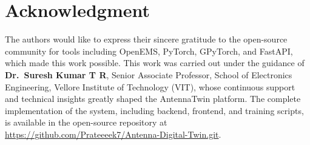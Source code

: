 \documentclass[conference]{IEEEtran}
\begin{document}
\section*{Acknowledgment}
The authors would like to express their sincere gratitude to the open-source community for tools including OpenEMS, PyTorch, GPyTorch, and FastAPI, which made this work possible. This work was carried out under the guidance of \textbf{Dr.\ Suresh Kumar T R}, Senior Associate Professor, School of Electronics Engineering, Vellore Institute of Technology (VIT), whose continuous support and technical insights greatly shaped the AntennaTwin platform. The complete implementation of the system, including backend, frontend, and training scripts, is available in the open-source repository at \url{https://github.com/Prateeeek7/Antenna-Digital-Twin.git}.
\end{document}
